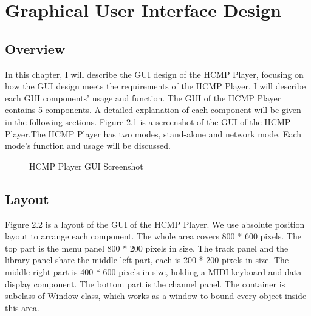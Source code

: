 
\chapter{Graphical User Interface Design} %

\section{Overview}
In this chapter, I will describe the GUI design of the HCMP Player, focusing 
on how the GUI design meets the requirements of the HCMP Player. I will describe
each GUI components' 
usage and function. The GUI of the HCMP Player contains 5 components.
A detailed explanation of each component will be given in the following sections. 
Figure 2.1 is a screenshot of the GUI of the HCMP Player.The HCMP Player has 
two modes, 
stand-alone and network mode. Each mode's function and usage will be discussed.

\begin{figure}[H]
\caption{HCMP Player GUI Screenshot}
\end{figure}

\section{Layout}
Figure 2.2 is a layout of the GUI of the HCMP Player. We use absolute position layout 
to arrange each component. The whole area 
covers 800 * 600 pixels. The top part is the menu panel 800 * 200 pixels 
in size. The track panel and 
the library panel share the middle-left part, each is 200 * 200 pixels in size. 
The middle-right part is 400 * 600 pixels in size, holding a MIDI keyboard and data 
display component. The bottom part is the channel panel. The container is subclass of
Window class, which works as a window to bound every object inside this area. 

